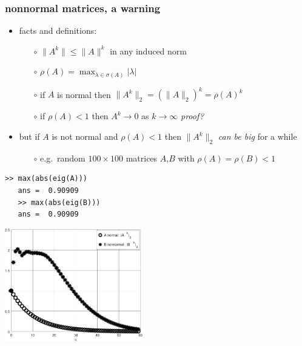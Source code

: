 \documentclass[10pt,hyperref]{beamer}
\begin{document}
\begin{frame}[fragile]
\frametitle{nonnormal matrices, a warning}

\begin{itemize}
\item facts and definitions:
    \begin{itemize}
    \item[$\circ$] $\|A^k\|\le \|A\|^k$ in any induced norm
    \item[$\circ$] $\rho(A) = \max_{\lambda\in\sigma(A)} |\lambda|$
    \item[$\circ$] if $A$ is normal then $\|A^k\|_2 = (\|A\|_2)^k = \rho(A)^k$
    \item[$\circ$] if $\rho(A)<1$ then $A^k \to 0$ as $k\to \infty$ \hfill \emph{proof?}
    \end{itemize}
\item but if $A$ is not normal and $\rho(A)<1$ then $\|A^k\|_2$ \emph{can be big} for a while
    \begin{itemize}
    \item[$\circ$] e.g.~random $100\times 100$ matrices $A$,$B$ with $\rho(A)=\rho(B)<1$
    \end{itemize}
\end{itemize}

\bigskip
\begin{Verbatim}[fontsize=\footnotesize]
   >> max(abs(eig(A)))
   ans =  0.90909
   >> max(abs(eig(B)))
   ans =  0.90909
\end{Verbatim}

\vspace{-17mm}
\hfill \includegraphics[width=0.45\textwidth]{figs/normpowers} \quad \phantom{foo}
\end{frame}
\end{document}
